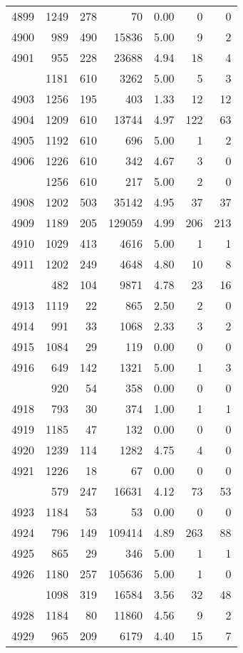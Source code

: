 \documentclass[
]{article}
\begin{document}
\begin{table}
\begin{tabular}[t]{lrrrrrr}
4899 & 1249 & 278 & 70 & 0.00 & 0 & 0\\
4900 & 989 & 490 & 15836 & 5.00 & 9 & 2\\
4901 & 955 & 228 & 23688 & 4.94 & 18 & 4\\
\addlinespace
4902 & 1181 & 610 & 3262 & 5.00 & 5 & 3\\
4903 & 1256 & 195 & 403 & 1.33 & 12 & 12\\
4904 & 1209 & 610 & 13744 & 4.97 & 122 & 63\\
4905 & 1192 & 610 & 696 & 5.00 & 1 & 2\\
4906 & 1226 & 610 & 342 & 4.67 & 3 & 0\\
\addlinespace
4907 & 1256 & 610 & 217 & 5.00 & 2 & 0\\
4908 & 1202 & 503 & 35142 & 4.95 & 37 & 37\\
4909 & 1189 & 205 & 129059 & 4.99 & 206 & 213\\
4910 & 1029 & 413 & 4616 & 5.00 & 1 & 1\\
4911 & 1202 & 249 & 4648 & 4.80 & 10 & 8\\
\addlinespace
4912 & 482 & 104 & 9871 & 4.78 & 23 & 16\\
4913 & 1119 & 22 & 865 & 2.50 & 2 & 0\\
4914 & 991 & 33 & 1068 & 2.33 & 3 & 2\\
4915 & 1084 & 29 & 119 & 0.00 & 0 & 0\\
4916 & 649 & 142 & 1321 & 5.00 & 1 & 3\\
\addlinespace
4917 & 920 & 54 & 358 & 0.00 & 0 & 0\\
4918 & 793 & 30 & 374 & 1.00 & 1 & 1\\
4919 & 1185 & 47 & 132 & 0.00 & 0 & 0\\
4920 & 1239 & 114 & 1282 & 4.75 & 4 & 0\\
4921 & 1226 & 18 & 67 & 0.00 & 0 & 0\\
\addlinespace
4922 & 579 & 247 & 16631 & 4.12 & 73 & 53\\
4923 & 1184 & 53 & 53 & 0.00 & 0 & 0\\
4924 & 796 & 149 & 109414 & 4.89 & 263 & 88\\
4925 & 865 & 29 & 346 & 5.00 & 1 & 1\\
4926 & 1180 & 257 & 105636 & 5.00 & 1 & 0\\
\addlinespace
4927 & 1098 & 319 & 16584 & 3.56 & 32 & 48\\
4928 & 1184 & 80 & 11860 & 4.56 & 9 & 2\\
4929 & 965 & 209 & 6179 & 4.40 & 15 & 7\\

\end{tabular}
\end{table}
\end{document}
